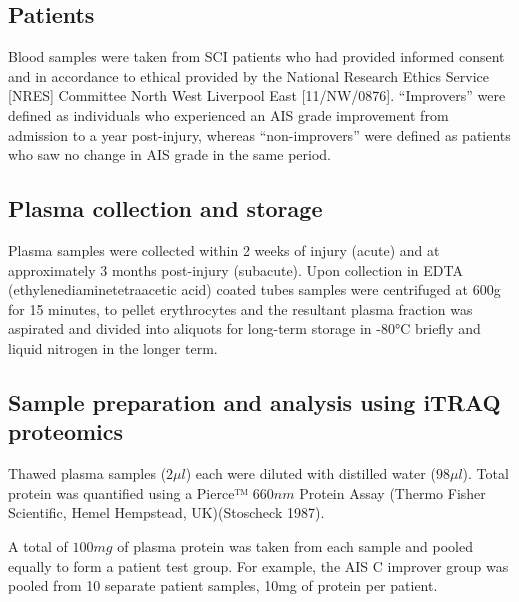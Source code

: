 \documentclass[9pt,lineno]{elife}
\begin{document}
\hypertarget{patients}{%
\subsection{Patients}\label{patients}}

Blood samples were taken from SCI patients who had provided informed consent and in accordance to ethical provided by the National Research Ethics Service {[}NRES{]} Committee North West Liverpool East {[}11/NW/0876{]}. ``Improvers'' were defined as individuals who experienced an AIS grade improvement from admission to a year post-injury, whereas ``non-improvers'' were defined as patients who saw no change in AIS grade in the same period.

\hypertarget{plasma-collection-and-storage}{%
\subsection{Plasma collection and storage}\label{plasma-collection-and-storage}}

Plasma samples were collected within 2 weeks of injury (acute) and at approximately 3 months post-injury (subacute). Upon collection in EDTA (ethylenediaminetetraacetic acid) coated tubes samples were centrifuged at 600g for 15 minutes, to pellet erythrocytes and the resultant plasma fraction was aspirated and divided into aliquots for long-term storage in -80°C briefly and liquid nitrogen in the longer term.

\hypertarget{itraq-sample-prep}{%
\subsection{Sample preparation and analysis using iTRAQ proteomics}\label{itraq-sample-prep}}

Thawed plasma samples (\(2\mu l\)) each were diluted with distilled water (\(98\mu l\)). Total protein was quantified using a Pierce™ \(660 nm\) Protein Assay (Thermo Fisher Scientific, Hemel Hempstead, UK)(Stoscheck 1987).

A total of \(100 mg\) of plasma protein was taken from each sample and pooled equally to form a patient test group.
For example, the AIS C improver group was pooled from 10 separate patient samples, 10mg of protein per patient.
\end{document}
